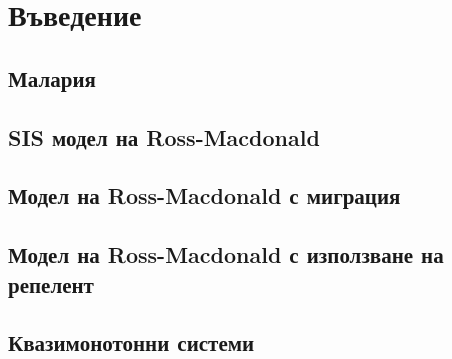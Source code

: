 \section{Въведение}
\subsection{Малария}
\subsection{SIS модел на Ross-Macdonald}
\subsection{Модел на Ross-Macdonald с миграция}
\cite{Bichara2016}
\subsection{Модел на Ross-Macdonald с използване на репелент}
\cite{Rashkov2019}
\subsection{Квазимонотонни системи}
\cite{Capasso2008}

